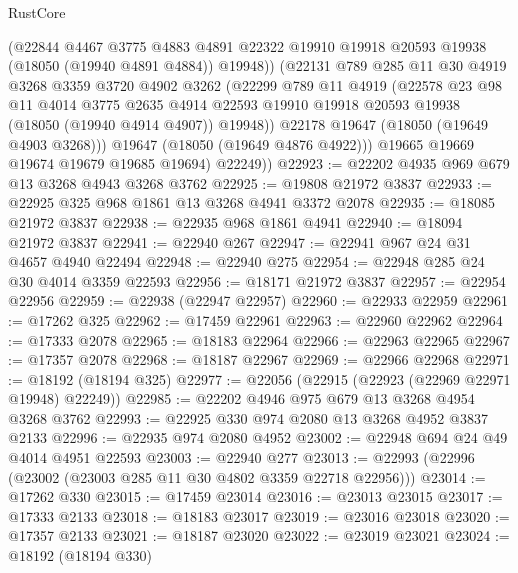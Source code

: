 \begin{lexlean}{RustCore}
\begin{coremodule}
              (@22844
                @4467
                @3775
                @4883
                @4891
                @22322
                @19910
                @19918
                @20593
                @19938
                (@18050 (@19940 @4891 @4884))
                @19948))
            (@22131
              @789
              @285
              @11
              @30
              @4919
              @3268
              @3359
              @3720
              @4902
              @3262
              (@22299
                @789
                @11
                @4919
                (@22578
                  @23
                  @98
                  @11
                  @4014
                  @3775
                  @2635
                  @4914
                  @22593
                  @19910
                  @19918
                  @20593
                  @19938
                  (@18050 (@19940 @4914 @4907))
                  @19948))
              @22178
              @19647
              (@18050 (@19649 @4903 @3268)))
            @19647
            (@18050 (@19649 @4876 @4922)))
          @19665
          @19669
          @19674
          @19679
          @19685
          @19694)
        @22249))
@22923 := @22202 @4935 @969 @679 @13 @3268 @4943 @3268 @3762
@22925 := @19808 @21972 @3837
@22933 := @22925 @325 @968 @1861 @13 @3268 @4941 @3372 @2078
@22935 := @18085 @21972 @3837
@22938 := @22935 @968 @1861 @4941
@22940 := @18094 @21972 @3837
@22941 := @22940 @267
@22947 := @22941 @967 @24 @31 @4657 @4940 @22494
@22948 := @22940 @275
@22954 := @22948 @285 @24 @30 @4014 @3359 @22593
@22956 := @18171 @21972 @3837
@22957 := @22954 @22956
@22959 := @22938 (@22947 @22957)
@22960 := @22933 @22959
@22961 := @17262 @325
@22962 := @17459 @22961
@22963 := @22960 @22962
@22964 := @17333 @2078
@22965 := @18183 @22964
@22966 := @22963 @22965
@22967 := @17357 @2078
@22968 := @18187 @22967
@22969 := @22966 @22968
@22971 := @18192 (@18194 @325)
@22977 := @22056 (@22915 (@22923 (@22969 @22971 @19948) @22249))
@22985 := @22202 @4946 @975 @679 @13 @3268 @4954 @3268 @3762
@22993 := @22925 @330 @974 @2080 @13 @3268 @4952 @3837 @2133
@22996 := @22935 @974 @2080 @4952
@23002 := @22948 @694 @24 @49 @4014 @4951 @22593
@23003 := @22940 @277
@23013 := @22993 (@22996 (@23002 (@23003 @285 @11 @30 @4802 @3359 @22718 @22956)))
@23014 := @17262 @330
@23015 := @17459 @23014
@23016 := @23013 @23015
@23017 := @17333 @2133
@23018 := @18183 @23017
@23019 := @23016 @23018
@23020 := @17357 @2133
@23021 := @18187 @23020
@23022 := @23019 @23021
@23024 := @18192 (@18194 @330)

\end{coremodule}
\end{lexlean}
